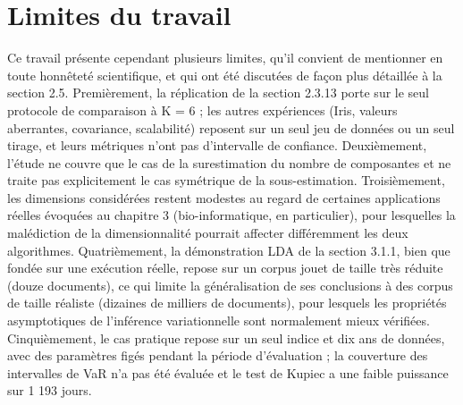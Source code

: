 \section*{Limites du travail}
Ce travail présente cependant plusieurs limites, qu'il convient de mentionner en toute honnêteté scientifique, et qui ont été discutées de façon plus détaillée à la section 2.5. Premièrement, la réplication de la section 2.3.13 porte sur le seul protocole de comparaison à K = 6 ; les autres expériences (Iris, valeurs aberrantes, covariance, scalabilité) reposent sur un seul jeu de données ou un seul tirage, et leurs métriques n'ont pas d'intervalle de confiance. Deuxièmement, l'étude ne couvre que le cas de la surestimation du nombre de composantes et ne traite pas explicitement le cas symétrique de la sous-estimation. Troisièmement, les dimensions considérées restent modestes au regard de certaines applications réelles évoquées au chapitre 3 (bio-informatique, en particulier), pour lesquelles la malédiction de la dimensionnalité pourrait affecter différemment les deux algorithmes. Quatrièmement, la démonstration LDA de la section 3.1.1, bien que fondée sur une exécution réelle, repose sur un corpus jouet de taille très réduite (douze documents), ce qui limite la généralisation de ses conclusions à des corpus de taille réaliste (dizaines de milliers de documents), pour lesquels les propriétés asymptotiques de l'inférence variationnelle sont normalement mieux vérifiées. Cinquièmement, le cas pratique repose sur un seul indice et dix ans de données, avec des paramètres figés pendant la période d'évaluation ; la couverture des intervalles de VaR n'a pas été évaluée et le test de Kupiec a une faible puissance sur 1 193 jours.

